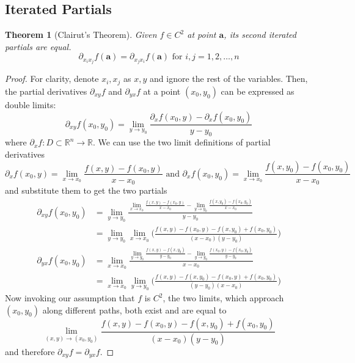 \documentclass{article}
\newtheorem{theorem}{Theorem}[section]
\theoremstyle{remark}
\theoremstyle{definition}
\begin{document}
\subsection{Iterated Partials}

\begin{theorem}[Clairut's Theorem]
Given $f \in C^2$ at point $\mathbf{a}$, its second iterated partials are equal. 
\[\partial_{x_i x_j} f (\mathbf{a})= \partial_{x_j x_i} f (\mathbf{a})\text{ for } i, j = 1, 2, \ldots, n\]
\end{theorem}
\begin{proof}
For clarity, denote $x_i, x_j$ as $x, y$ and ignore the rest of the variables. Then, the partial derivatives $\partial_{x y} f$ and $\partial_{y x} f$ at a point $(x_0, y_0)$ can be expressed as double limits: 
\[\partial_{x y} f (x_0, y_0) = \lim_{y \rightarrow y_0} \frac{\partial_x f (x_0, y) - \partial_x f (x_0, y_0)}{y - y_0}\]
where $\partial_x f: D \subset \mathbb{R}^n \longrightarrow \mathbb{R}$. We can use the two limit definitions of partial derivatives
\[\partial_x f (x_0, y) = \lim_{x \rightarrow x_0} \frac{f(x, y) - f(x_0, y)}{x-x_0} \text{ and } \partial_x f (x_0, y_0) = \lim_{x \rightarrow x_0} \frac{f(x, y_0) - f(x_0, y_0)}{x-x_0}\]
and substitute them to get the two partials
\begin{align*}
    \partial_{xy} f (x_0, y_0) & = \lim_{y \rightarrow y_0} \frac{ \lim_{x \rightarrow x_0} \frac{f(x, y) - f(x_0, y)}{x-x_0} - \lim_{y \rightarrow y_0} \frac{f(x, y_0) - f(x_0, y_0)}{x-x_0}}{y - y_0} \\
    & =  \lim_{y \rightarrow y_0} \lim_{x \rightarrow x_0} \bigg( \frac{f(x, y) - f(x_0, y) - f(x, y_0) + f(x_0, y_0)}{(x - x_0) (y - y_0)} \bigg) \\
    \partial_{yx} f (x_0, y_0) & = \lim_{x \rightarrow x_0} \frac{ \lim_{y \rightarrow y_0} \frac{f(x, y) - f(x, y_0)}{y-y_0} - \lim_{y \rightarrow y_0} \frac{f(x_0, y) - f(x_0, y_0)}{y-y_0}}{x - x_0} \\
    & = \lim_{x \rightarrow x_0} \lim_{y \rightarrow y_0} \bigg( \frac{f(x, y) - f(x, y_0) - f(x_0, y) + f(x_0, y_0)}{(y-y_0) (x-x_0)} \bigg)
\end{align*}
Now invoking our assumption that $f$ is $C^2$, the two limits, which approach $(x_0, y_0)$ along different paths, both exist and are equal to 
\[\lim_{(x, y) \rightarrow (x_0, y_0)} \frac{f(x, y) - f(x_0, y) - f(x, y_0) + f(x_0, y_0)}{(x - x_0) (y - y_0)}\]
and therefore $\partial_{x y} f = \partial_{y x} f$. 
\end{proof}
\end{document}
